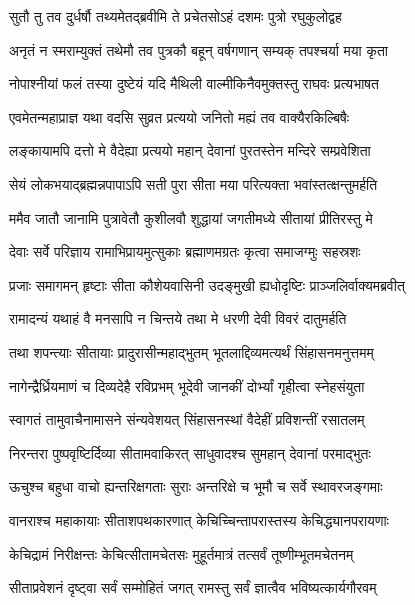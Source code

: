 \twolineshloka
{सुतौ तु तव दुर्धर्षौ तथ्यमेतद्ब्रवीमि ते}
{प्रचेतसोऽहं दशमः पुत्रो रघुकुलोद्वह} %

\twolineshloka
{अनृतं न स्मराम्युक्तं तथेमौ तव पुत्रकौ}
{बहून् वर्षगणान् सम्यक् तपश्चर्या मया कृता} %

\twolineshloka
{नोपाश्नीयां फलं तस्या दुष्टेयं यदि मैथिली}
{वाल्मीकिनैवमुक्तस्तु राघवः प्रत्यभाषत} %

\twolineshloka
{एवमेतन्महाप्राज्ञ यथा वदसि सुव्रत}
{प्रत्ययो जनितो मह्यं तव वाक्यैरकिल्बिषैः} %

\twolineshloka
{लङ्कायामपि दत्तो मे वैदेह्या प्रत्ययो महान्}
{देवानां पुरतस्तेन मन्दिरे सम्प्रवेशिता} %

\twolineshloka
{सेयं लोकभयाद्ब्रह्मन्नपापाऽपि सती पुरा}
{सीता मया परित्यक्ता भवांस्तत्क्षन्तुमर्हति} %

\twolineshloka
{ममैव जातौ जानामि पुत्रावेतौ कुशीलवौ}
{शुद्धायां जगतीमध्ये सीतायां प्रीतिरस्तु मे} %

\twolineshloka
{देवाः सर्वे परिज्ञाय रामाभिप्रायमुत्सुकाः}
{ब्रह्माणमग्रतः कृत्वा समाजग्मुः सहस्रशः} %

\twolineshloka
{प्रजाः समागमन् हृष्टाः सीता कौशेयवासिनी}
{उदङ्मुखी ह्यधोदृष्टिः प्राञ्जलिर्वाक्यमब्रवीत्} %

\twolineshloka
{रामादन्यं यथाहं वै मनसापि न चिन्तये}
{तथा मे धरणी देवी विवरं दातुमर्हति} %

\twolineshloka
{तथा शपन्त्याः सीतायाः प्रादुरासीन्महाद्भुतम्}
{भूतलाद्दिव्यमत्यर्थं सिंहासनमनुत्तमम्} %

\twolineshloka
{नागेन्द्रैर्ध्रियमाणं च दिव्यदेहै रविप्रभम्}
{भूदेवी जानकीं दोर्भ्यां गृहीत्वा स्नेहसंयुता} %

\twolineshloka
{स्वागतं तामुवाचैनामासने संन्यवेशयत्}
{सिंहासनस्थां वैदेहीं प्रविशन्तीं रसातलम्} %

\twolineshloka
{निरन्तरा पुष्पवृष्टिर्दिव्या सीतामवाकिरत्}
{साधुवादश्च सुमहान् देवानां परमाद्भुतः} %

\twolineshloka
{ऊचुश्च बहुधा वाचो ह्यन्तरिक्षगताः सुराः}
{अन्तरिक्षे च भूमौ च सर्वे स्थावरजङ्गमाः} %

\twolineshloka
{वानराश्च महाकायाः सीताशपथकारणात्}
{केचिच्चिन्तापरास्तस्य केचिद्ध्यानपरायणाः} %

\twolineshloka
{केचिद्रामं निरीक्षन्तः केचित्सीतामचेतसः}
{मुहूर्तमात्रं तत्सर्वं तूष्णीम्भूतमचेतनम्} %

\twolineshloka
{सीताप्रवेशनं दृष्ट्वा सर्वं सम्मोहितं जगत्}
{रामस्तु सर्वं ज्ञात्वैव भविष्यत्कार्यगौरवम्} %

